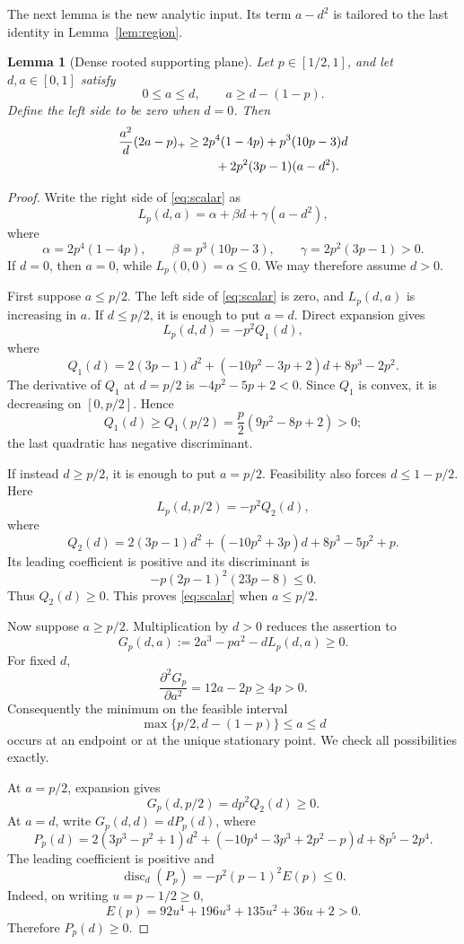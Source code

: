 \documentclass[11pt]{article}
\newtheorem{lemma}[theorem]{Lemma}
\begin{document}
The next lemma is the new analytic input.  Its term $a-d^2$ is tailored to
the last identity in Lemma~\ref{lem:region}.

\begin{lemma}[Dense rooted supporting plane]\label{lem:scalar}
Let $p\in[1/2,1]$, and let $d,a\in[0,1]$ satisfy
\[
 0\leq a\leq d,
 \qquad a\geq d-(1-p).
\]
Define the left side to be zero when $d=0$.  Then
\begin{align}
 \frac{a^2}{d}(2a-p)_+
 \geq{}&2p^4(1-4p)+p^3(10p-3)d
 \notag\\
 &\quad+2p^2(3p-1)(a-d^2).
 \label{eq:scalar}
\end{align}
\end{lemma}

\begin{proof}
Write the right side of \eqref{eq:scalar} as
\[
 L_p(d,a)=\alpha+\beta d+\gamma(a-d^2),
\]
where
\[
 \alpha=2p^4(1-4p),\qquad
 \beta=p^3(10p-3),\qquad
 \gamma=2p^2(3p-1)>0.
\]
If $d=0$, then $a=0$, while $L_p(0,0)=\alpha\leq0$.
We may therefore assume $d>0$.

First suppose $a\leq p/2$.  The left side of \eqref{eq:scalar} is zero,
and $L_p(d,a)$ is increasing in $a$.  If $d\leq p/2$, it is enough to put
$a=d$.  Direct expansion gives
\[
 L_p(d,d)=-p^2Q_1(d),
\]
where
\[
 Q_1(d)=2(3p-1)d^2+(-10p^2-3p+2)d+8p^3-2p^2.
\]
The derivative of $Q_1$ at $d=p/2$ is
$-4p^2-5p+2<0$.  Since $Q_1$ is convex, it is decreasing on
$[0,p/2]$.  Hence
\[
 Q_1(d)\geq Q_1(p/2)
 =\frac p2(9p^2-8p+2)>0;
\]
the last quadratic has negative discriminant.

If instead $d\geq p/2$, it is enough to put $a=p/2$.  Feasibility also
forces $d\leq1-p/2$.  Here
\[
 L_p(d,p/2)=-p^2Q_2(d),
\]
where
\[
 Q_2(d)=2(3p-1)d^2+(-10p^2+3p)d+8p^3-5p^2+p.
\]
Its leading coefficient is positive and its discriminant is
\[
 -p(2p-1)^2(23p-8)\leq0.
\]
Thus $Q_2(d)\geq0$.  This proves \eqref{eq:scalar} when $a\leq p/2$.

Now suppose $a\geq p/2$.  Multiplication by $d>0$ reduces the assertion to
\begin{equation}
 G_p(d,a):=2a^3-pa^2-dL_p(d,a)\geq0.
 \label{eq:G}
\end{equation}
For fixed $d$,
\[
 \frac{\partial^2G_p}{\partial a^2}=12a-2p\geq4p>0.
\]
Consequently the minimum on the feasible interval
\[
 \max\{p/2,d-(1-p)\}\leq a\leq d
\]
occurs at an endpoint or at the unique stationary point.  We check all
possibilities exactly.

At $a=p/2$, expansion gives
\[
 G_p(d,p/2)=dp^2Q_2(d)\geq0.
\]
At $a=d$, write $G_p(d,d)=dP_p(d)$, where
\[
 P_p(d)=2(3p^3-p^2+1)d^2
 +(-10p^4-3p^3+2p^2-p)d+8p^5-2p^4.
\]
The leading coefficient is positive and
\[
 \operatorname{disc}_d(P_p)
 =-p^2(p-1)^2E(p)\leq0.
\]
Indeed, on writing $u=p-1/2\geq0$,
\[
 E(p)=92u^4+196u^3+135u^2+36u+2>0.
\]
Therefore $P_p(d)\geq0$.


\end{proof}
\end{document}
